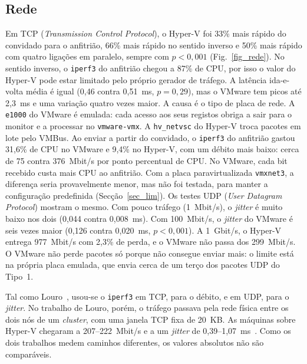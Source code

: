 \documentclass[conference]{IEEEtran}
\begin{document}
\subsection{Rede}
Em TCP (\textit{Transmission Control Protocol}), o Hyper-V foi 33\% mais rápido do convidado para o anfitrião, 66\% mais rápido no sentido inverso e 50\% mais rápido com quatro ligações em paralelo, sempre com $p<0{,}001$ (Fig.~\ref{fig_rede}). No sentido inverso, o \texttt{iperf3} do anfitrião chegou a 87\% de CPU, por isso o valor do Hyper-V pode estar limitado pelo próprio gerador de tráfego. A latência ida-e-volta média é igual (0,46 contra 0,51~ms, $p=0{,}29$), mas o VMware tem picos até 2,3~ms e uma variação quatro vezes maior. A causa é o tipo de placa de rede. A \texttt{e1000} do VMware é emulada: cada acesso aos seus registos obriga a sair para o monitor e a processar no \texttt{vmware-vmx}. A \texttt{hv\_netvsc} do Hyper-V troca pacotes em lote pelo VMBus. Ao enviar a partir do convidado, o \texttt{iperf3} do anfitrião gastou 31,6\% de CPU no VMware e 9,4\% no Hyper-V, com um débito mais baixo: cerca de 75 contra 376~Mbit/s por ponto percentual de CPU. No VMware, cada bit recebido custa mais CPU ao anfitrião. Com a placa paravirtualizada \texttt{vmxnet3}, a diferença seria provavelmente menor, mas não foi testada, para manter a configuração predefinida (Secção~\ref{sec_lim}). Os testes UDP (\textit{User Datagram Protocol}) mostram o mesmo. Com pouco tráfego (1~Mbit/s), o \textit{jitter} é muito baixo nos dois (0,044 contra 0,008~ms). Com 100~Mbit/s, o \textit{jitter} do VMware é seis vezes maior (0,126 contra 0,020~ms, $p<0{,}001$). A 1~Gbit/s, o Hyper-V entrega 977~Mbit/s com 2,3\% de perda, e o VMware não passa dos 299~Mbit/s. O VMware não perde pacotes só porque não consegue enviar mais: o limite está na própria placa emulada, que envia cerca de um terço dos pacotes UDP do Tipo~1.

Tal como Louro~\cite{b3}, usou-se o \texttt{iperf3} em TCP, para o débito, e em UDP, para o \textit{jitter}. No trabalho de Louro, porém, o tráfego passava pela rede física entre os dois nós de um \textit{cluster}, com uma janela TCP fixa de 20~KB. As máquinas sobre Hyper-V chegaram a 207--222~Mbit/s e a um \textit{jitter} de 0,39--1,07~ms~\cite[Figs.~4.3--4.4]{b3}. Como os dois trabalhos medem caminhos diferentes, os valores absolutos não são comparáveis.
\end{document}
